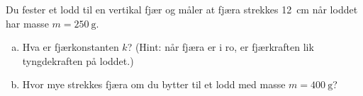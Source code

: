 %
Du fester et lodd til en vertikal fjær og måler at fjæra strekkes \SI{12}{\centi\metre} når loddet har masse $m = \SI{250}{\gram}$.
\begin{enumerate}[a)]
    \item Hva er fjærkonstanten $k$? (Hint: når fjæra er i ro, er fjærkraften lik tyngdekraften på loddet.)
    \item Hvor mye strekkes fjæra om du bytter til et lodd med masse $m = \SI{400}{\gram}$?
\end{enumerate}

